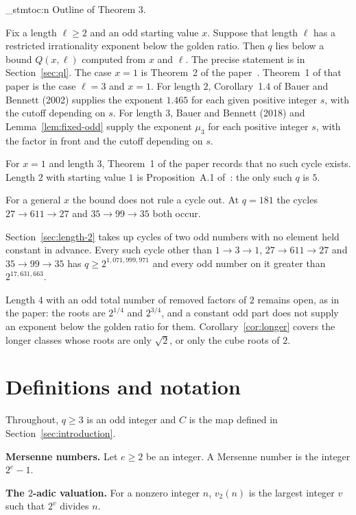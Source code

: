 \documentclass[11pt]{article}
\newenvironment{named}[1]{%
  \par\addvspace{\medskipamount}%
  \pagebreak[3]%
  \noindent{\bfseries #1}\space\ignorespaces
  \stmtoc{#1}%
}{\par\addvspace{\medskipamount}}
\newcommand{\topic}[1]{\par\noindent\textbf{#1}}
\newcommand{\stmtoc}[1]{ \qn_stmtoc:n {#1} }
\begin{document}
\begin{named}{Outline of Theorem 3.}
Fix a length $\ell \ge 2$ and an odd starting value $x$.
Suppose that length $\ell$ has a restricted irrationality exponent below the golden ratio.
Then $q$ lies below a bound $Q(x, \ell)$ computed from $x$ and $\ell$.
The precise statement is in Section~\ref{sec:ql}.
The case $x = 1$ is Theorem~2 of the paper~\cite{hackman-i}.
Theorem~1 of that paper is the case $\ell = 3$ and $x = 1$.
For length $2$, Corollary~1.4 of Bauer and Bennett (2002) supplies the exponent $1.465$ for each given positive integer $s$, with the cutoff depending on $s$.
For length $3$, Bauer and Bennett (2018) and Lemma~\ref{lem:fixed-odd} supply the exponent $\mu_3$ for each positive integer $s$, with the factor in front and the cutoff depending on $s$.
\end{named}

For $x = 1$ and length $3$, Theorem~1 of the paper records that no such cycle exists.
Length $2$ with starting value $1$ is Proposition~A.1 of~\cite{hackman-i}: the only such $q$ is $5$.

For a general $x$ the bound does not rule a cycle out.
At $q = 181$ the cycles $27 \to 611 \to 27$ and $35 \to 99 \to 35$ both occur.

Section~\ref{sec:length-2} takes up cycles of two odd numbers with no element held constant in advance.
Every such cycle other than $1 \to 3 \to 1$, $27 \to 611 \to 27$ and $35 \to 99 \to 35$ has $q \ge 2^{1{,}071{,}999{,}971}$ and every odd number on it greater than $2^{17{,}631{,}663}$.

Length $4$ with an odd total number of removed factors of $2$ remains open, as in the paper: the roots are $2^{1/4}$ and $2^{3/4}$, and a constant odd part does not supply an exponent below the golden ratio for them.
Corollary~\ref{cor:longer} covers the longer classes whose roots are only $\sqrt{2}$, or only the cube roots of $2$.

\section{Definitions and notation}
\label{sec:definitions}

Throughout, $q \ge 3$ is an odd integer and $C$ is the map defined in Section~\ref{sec:introduction}.

\topic{Mersenne numbers.}
Let $e \ge 2$ be an integer.
A Mersenne number is the integer $2^e - 1$.

\topic{The $2$-adic valuation.}
For a nonzero integer $n$, $v_2(n)$ is the largest integer $v$ such that $2^v$ divides $n$.
\end{document}
